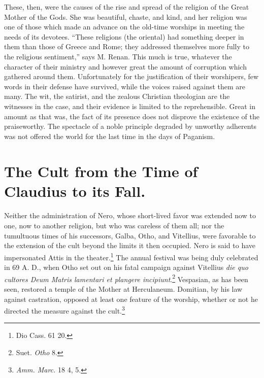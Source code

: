 \documentclass[a4paper, 11pt, oneside, polutonikogreek, english]{article}
\begin{document}
These, then, were the causes of the rise and spread of the religion of the Great Mother of the Gods. She was beautiful, chaste, and kind, and her religion was one of those which made an advance on the old-time worships in meeting the needs of its devotees. ``These religions (the oriental) had something deeper in them than those of Greece and Rome; they addressed themselves more fully to the religious sentiment,'' says M. Renan. This much is true, whatever the character of their ministry and however great the amount of corruption which gathered around them. Unfortunately for the justification of their worshipers, few words in their defense have survived, while the voices raised against them are many. The wit, the satirist, and the zealous Christian theologian are the witnesses in the case, and their evidence is limited to the reprehensible. Great in amount as that was, the fact of its presence does not disprove the existence of the praiseworthy. The spectacle of a noble principle degraded by unworthy adherents was not offered the world for the last time in the days of Paganism.
\clearpage
\section{The Cult from the Time of Claudius to its Fall.}
\paragraph{}
Neither the administration of Nero, whose short-lived favor was extended now to one, now to another religion, but who was careless of them all; nor the tumultuous times of his successors, Galba, Otho, and Vitellius, were favorable to the extension of the cult beyond the limits it then occupied. Nero is said to have impersonated Attis in the theater.\footnote{Dio Cass. 61 20.} The annual festival was being duly celebrated in 69 A. D., when Otho set out on his fatal campaign against Vitellius \emph{die quo cultores Deum Matris lamentari et plangere incipiunt}.\footnote{Suet. \emph{Otho} 8.} Vespasian, as has been seen, restored a temple of the Mother at Herculaneum. Domitian, by his law against castration, opposed at least one feature of the worship, whether or not he directed the measure against the cult.\footnote{\emph{Amm. Marc.} 18 4, 5.}
\end{document}
